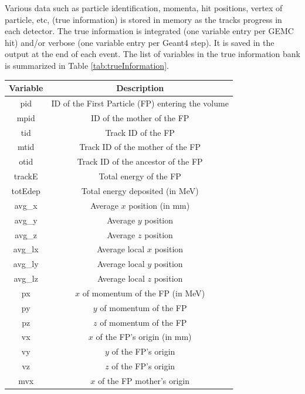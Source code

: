 Various data such as particle identification, momenta, hit positions, vertex of particle, etc, (true information) is stored in memory
as the tracks progress in each detector. The true information is integrated (one variable entry per GEMC hit) and/or
verbose (one variable entry per Geant4 step). It is saved in the output at the end of each event.
The list of variables in the true information bank is summarized in Table \ref{tab:trueInformation}.

\begin{table}[h]
	\small
	\begin{center}
		\begin{tabular}{| c | c |}
			\hline \hline
			Variable    & Description  \\
			\hline
				pid         &   ID of the First Particle (FP) entering the volume \\
				mpid        &   ID of the mother of the FP \\
				tid         &   Track ID of the FP\\
				mtid        &   Track ID of the mother of the FP  \\
				otid        &   Track ID of the ancestor of the FP \\
				trackE      &   Total energy of the FP \\
				totEdep     &   Total energy deposited (in MeV) \\
				avg\_x      &   Average $x$ position  (in mm) \\
				avg\_y      &   Average $y$ position  \\
				avg\_z      &   Average $z$ position  \\
				avg\_lx     &   Average local $x$ position \\
				avg\_ly     &   Average local $y$ position \\
				avg\_lz     &   Average local $z$ position \\
				px          &   $x$  of momentum of the FP (in MeV) \\
				py          &   $y$  of momentum of the FP \\
				pz          &   $z$  of momentum of the FP \\
				vx          &   $x$  of the FP's origin (in mm) \\
				vy          &   $y$  of the FP's origin \\
				vz          &   $z$  of the FP's origin \\
				mvx         &   $x$  of the FP mother's origin\\

\end{tabular}
\end{center}
\end{table}
